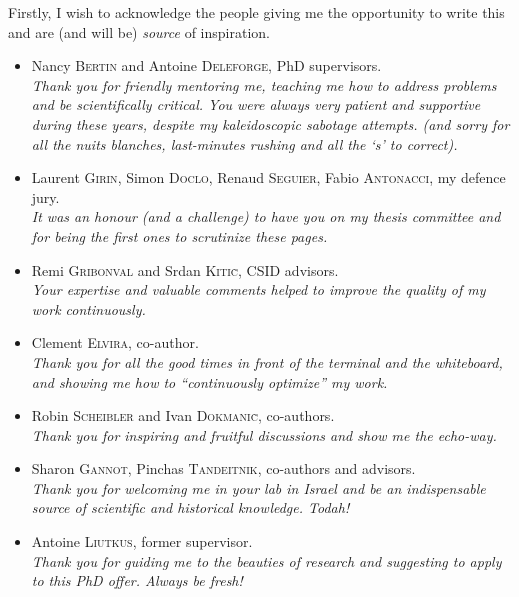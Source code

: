 \mynewline
Firstly, I wish to acknowledge the people giving me the opportunity to write this and are (and will be) \textit{source} of inspiration.
\begin{itemize}
    \item Nancy \textsc{Bertin} and Antoine \textsc{Deleforge}, PhD supervisors.
    \\\textit{Thank you for friendly mentoring me, teaching me how to address problems and be scientifically critical.
    You were always very patient and supportive during these years, despite my kaleidoscopic sabotage attempts.
    (and sorry for all the \emph{nuits blanches}, last-minutes rushing and all the `s' to correct).}

    \item Laurent \textsc{Girin}, Simon \textsc{Doclo}, Renaud \textsc{Seguier}, Fabio \textsc{Antonacci}, my defence jury.
    \\\textit{It was an honour (and a challenge) to have you on my thesis committee and for being the first ones to scrutinize these pages.}

    \item Remi \textsc{Gribonval} and Srdan \textsc{Kiti\`c}, CSID advisors.
    \\\textit{Your expertise and valuable comments helped to improve the quality of my work continuously.}

    \item Clement \textsc{Elvira}, co-author.
    \\\textit{Thank you for all the good times in front of the terminal and the whiteboard, and showing me how to ``continuously optimize'' my work.}

    \item Robin \textsc{Scheibler} and Ivan \textsc{Dokmani\`c}, co-authors.
    \\\textit{Thank you for inspiring and fruitful discussions and show me the echo-way.}

    \item Sharon \textsc{Gannot}, Pinchas \textsc{Tandeitnik}, co-authors and advisors.
    \\\textit{Thank you for welcoming me in your lab in Israel and be an indispensable source of scientific and historical knowledge. Todah!}

    \item Antoine \textsc{Liutkus}, former supervisor.
    \\\textit{Thank you for guiding me to the beauties of research and suggesting to apply to this PhD offer. Always be fresh!}
\end{itemize}

